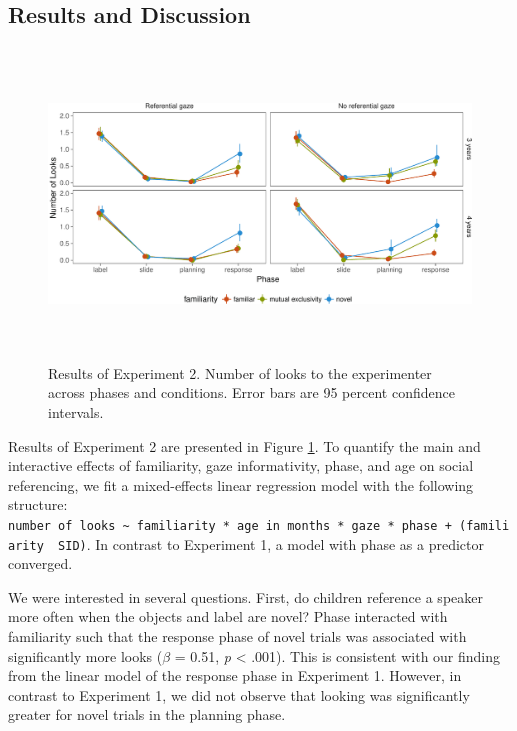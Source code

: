 \documentclass[10pt, letterpaper]{article}
\newenvironment{CodeChunk}{}{}
\begin{document}
\subsection{Results and Discussion}\label{results-and-discussion-1}

\begin{CodeChunk}
\begin{figure}[h]

{\centering \includegraphics[width=6.5in,height=3.25in]{figs/results_e2-1} 

}

\caption[Results of Experiment 2]{Results of Experiment 2. Number of looks to the experimenter across phases and conditions. Error bars are 95 percent confidence intervals.}\label{fig:results_e2}
\end{figure}
\end{CodeChunk}

Results of Experiment 2 are presented in Figure \ref{fig:results_e2}. To
quantify the main and interactive effects of familiarity, gaze
informativity, phase, and age on social referencing, we fit a
mixed-effects linear regression model with the following structure:
\texttt{number\ of\ looks\ \textasciitilde{}\ familiarity\ *\ age\ in\ months\ *\ gaze\ *\ phase\ +\ (familiarity\ \textbar{}\ SID)}.
In contrast to Experiment 1, a model with phase as a predictor
converged.

We were interested in several questions. First, do children reference a
speaker more often when the objects and label are novel? Phase
interacted with familiarity such that the response phase of novel trials
was associated with significantly more looks (\(\beta\) = 0.51, \emph{p}
\textless{} .001). This is consistent with our finding from the linear
model of the response phase in Experiment 1. However, in contrast to
Experiment 1, we did not observe that looking was significantly greater
for novel trials in the planning phase.
\end{document}
